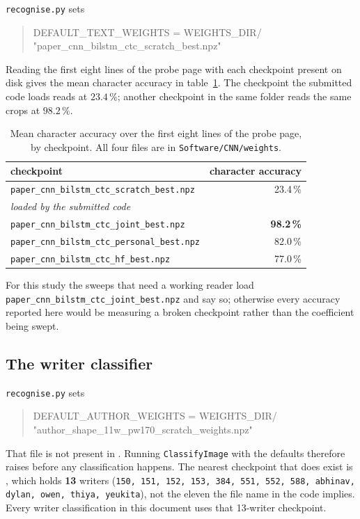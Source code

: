 \documentclass[11pt,a4paper]{article}
\begin{document}
\texttt{recognise.py} sets
\begin{quote}
\small\ttfamily\raggedright
DEFAULT\_TEXT\_WEIGHTS = WEIGHTS\_DIR/\\
"paper\_cnn\_bilstm\_ctc\_scratch\_best.npz"
\end{quote}
Reading the first eight lines of the probe page with each checkpoint present on
disk gives the mean character accuracy in table~\ref{tab:ckpt}. The checkpoint
the submitted code loads reads at $23.4\,\%$; another checkpoint in the same
folder reads the same crops at $98.2\,\%$.

\begin{table}[htbp]
\centering
\caption{Mean character accuracy over the first eight lines of the probe page,
by checkpoint. All four files are in \texttt{Software/CNN/weights}.}
\label{tab:ckpt}
\small
\begin{tabular}{lr}
\toprule
\textsf{checkpoint} & \textsf{character accuracy} \\
\midrule
\texttt{paper\_cnn\_bilstm\_ctc\_scratch\_best.npz} & 23.4\,\% \\
\multicolumn{2}{l}{\quad\itshape loaded by the submitted code} \\
\texttt{paper\_cnn\_bilstm\_ctc\_joint\_best.npz} & \textbf{98.2\,\%} \\
\texttt{paper\_cnn\_bilstm\_ctc\_personal\_best.npz} & 82.0\,\% \\
\texttt{paper\_cnn\_bilstm\_ctc\_hf\_best.npz} & 77.0\,\% \\
\bottomrule
\end{tabular}
\end{table}

For this study the sweeps that need a working reader load
\texttt{paper\_cnn\_bilstm\_ctc\_joint\_best.npz} and say so; otherwise every
accuracy reported here would be measuring a broken checkpoint rather than the
coefficient being swept.

\subsection{The writer classifier}

\texttt{recognise.py} sets
\begin{quote}
\small\ttfamily\raggedright
DEFAULT\_AUTHOR\_WEIGHTS = WEIGHTS\_DIR/\\
"author\_shape\_11w\_pw170\_scratch\_weights.npz"
\end{quote}
That file is not present in . Running
\texttt{ClassifyImage} with the defaults therefore raises before any
classification happens. The nearest checkpoint that does exist is
, which holds \textbf{13} writers
(\texttt{150, 151, 152, 153, 384, 551, 552, 588, abhinav, dylan, owen, thiya,
yeukita}), not the eleven the file name in the code implies. Every writer
classification in this document uses that 13-writer checkpoint.
\end{document}
